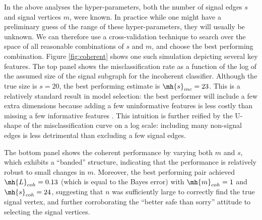 \documentclass[10pt,journal,cspaper,compsoc]{IEEEtran}
\begin{document}
In the above analyses the hyper-parameters, both the number of signal edges $s$ and signal vertices $m$, were known.  In practice while one might have a preliminary guess of the range of these hyper-parameters, they will usually be unknown.  We can therefore use a cross-validation technique to search over the space of all reasonable combinations of $s$ and $m$, and choose the best performing combination.  Figure \ref{fig:coherent} shows one such simulation depicting several key features.  The top panel shows the misclassification rate as a function of the log of the assumed size of the signal subgraph for the incoherent classifier.  Although the true size is $s=20$, the best performing estimate is $\mh{s}_{inc}=23$. This is a relatively standard result in model selection: the best performer will include a few extra dimensions because adding a few uninformative features is less costly than missing a few informative features \cite{Jain2000}.  This intuition is further reified by the U-shape of the misclassification curve on a log scale: including many non-signal edges is less detrimental than excluding a few signal edges.

The bottom panel shows the coherent performance by varying both $m$ and $s$, which exhibits a ``banded''  structure, indicating that the performance is relatively robust to small changes in $m$.  Moreover, the best performing pair achieved $\mh{L}_{coh}=0.13$ (which is equal to the Bayes error) with $\mh{m}_{coh}=1$ and $\mh{s}_{coh}=24$, suggesting that $n$ was sufficiently large to correctly find the true signal vertex, and further corroborating the ``better safe than sorry'' attitude to selecting the signal vertices. 
\end{document}
